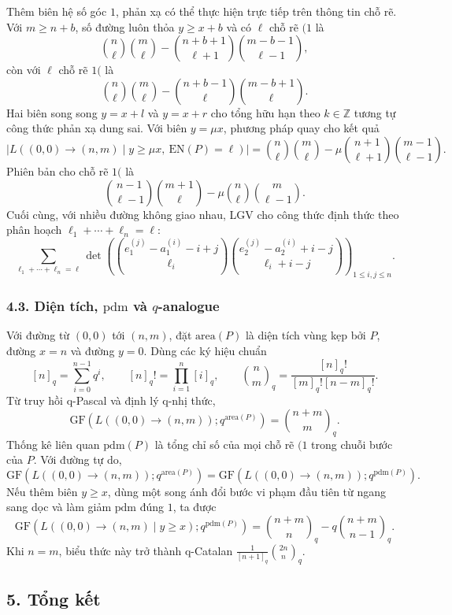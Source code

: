 \documentclass[11pt]{article}
\begin{document}
Thêm biên hệ số góc \(1\), phản xạ có thể thực hiện trực tiếp trên thông tin
chỗ rẽ. Với \(m\ge n+b\), số đường luôn thỏa \(y\ge x+b\) và có \(\ell\) chỗ
rẽ \((1\) là
\[
  \binom n\ell\binom m\ell
  -
  \binom{n+b+1}{\ell+1}\binom{m-b-1}{\ell-1},
\]
còn với \(\ell\) chỗ rẽ \(1(\) là
\[
  \binom n\ell\binom m\ell
  -
  \binom{n+b-1}{\ell}\binom{m-b+1}{\ell}.
\]
Hai biên song song \(y=x+l\) và \(y=x+r\) cho tổng hữu hạn theo \(k\in\mathbb Z\)
tương tự công thức phản xạ dung sai. Với biên \(y=\mu x\), phương pháp quay
cho kết quả
\[
  |L((0,0)\to(n,m)\mid y\ge \mu x,\ \mathrm{EN}(P)=\ell)|
  =
  \binom n\ell\binom m\ell
  -
  \mu\binom{n+1}{\ell+1}\binom{m-1}{\ell-1}.
\]
Phiên bản cho chỗ rẽ \(1(\) là
\[
  \binom{n-1}{\ell-1}\binom{m+1}{\ell}
  -
  \mu\binom n\ell\binom m{\ell-1}.
\]
Cuối cùng, với nhiều đường không giao nhau, LGV cho công thức định thức theo
phân hoạch \(\ell_1+\cdots+\ell_n=\ell\):
\[
  \sum_{\ell_1+\cdots+\ell_n=\ell}
  \det\left(
    \binom{e_1^{(j)}-a_1^{(i)}-i+j}{\ell_i}
    \binom{e_2^{(j)}-a_2^{(i)}+i-j}{\ell_i+i-j}
  \right)_{1\le i,j\le n}.
\]

\subsubsection*{4.3. Diện tích, \(\mathrm{pdm}\) và \(q\)-analogue}

Với đường từ \((0,0)\) tới \((n,m)\), đặt \(\mathrm{area}(P)\) là diện tích
vùng kẹp bởi \(P\), đường \(x=n\) và đường \(y=0\). Dùng các ký hiệu chuẩn
\[
  [n]_q=\sum_{i=0}^{n-1}q^i,\qquad
  [n]_q!=\prod_{i=1}^n[i]_q,\qquad
  \binom nm_q=\frac{[n]_q!}{[m]_q![n-m]_q!}.
\]
Từ truy hồi q-Pascal và định lý q-nhị thức,
\[
  \mathrm{GF}(L((0,0)\to(n,m));q^{\mathrm{area}(P)})
  =
  \binom{n+m}{m}_q.
\]
Thống kê liên quan \(\mathrm{pdm}(P)\) là tổng chỉ số của mọi chỗ rẽ \((1\)
trong chuỗi bước của \(P\). Với đường tự do,
\[
  \mathrm{GF}(L((0,0)\to(n,m));q^{\mathrm{area}(P)})
  =
  \mathrm{GF}(L((0,0)\to(n,m));q^{\mathrm{pdm}(P)}).
\]
Nếu thêm biên \(y\ge x\), dùng một song ánh đổi bước vi phạm đầu tiên từ ngang
sang dọc và làm giảm \(\mathrm{pdm}\) đúng \(1\), ta được
\[
  \mathrm{GF}(L((0,0)\to(n,m)\mid y\ge x);q^{\mathrm{pdm}(P)})
  =
  \binom{n+m}{n}_q
  -
  q\binom{n+m}{n-1}_q.
\]
Khi \(n=m\), biểu thức này trở thành q-Catalan
\(\frac1{[n+1]_q}\binom{2n}{n}_q\).

\subsection*{5. Tổng kết}
\end{document}
